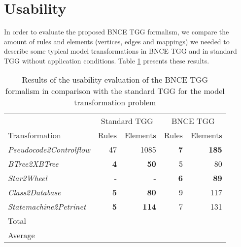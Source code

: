 
\section{Usability}
In order to evaluate the proposed BNCE TGG formalism, we compare the amount of rules and elements (vertices, edges and mappings) we needed to describe some typical model transformations in BNCE TGG and in standard TGG without application conditions. Table \ref{tab:formalism-eval} presents these results.


\begin{table}[h]
	\centering
	\begin{tabular}{l r r r r }
		\hline
						& \multicolumn{2}{c}{Standard TGG} & \multicolumn{2}{c}{BNCE TGG}\\
		Transformation 					& Rules & Elements 	& Rules & Elements\\
		\hline
		\emph{Pseudocode2Controlflow}	& 47			& 1085	& \textbf{7}	& \textbf{185} \\
		\emph{BTree2XBTree}				& \textbf{4}	& \textbf{50}	& 5		& 80 \\
		\emph{Star2Wheel}				& -				& -		& \textbf{6} 	& \textbf{89} \\
		\emph{Class2Database}			& \textbf{5}	& \textbf{80}	& 9 	& 117  \\
		\emph{Statemachine2Petrinet}	& \textbf{5}	& \textbf{114}	& 7		& 131 \\
		
		\hline
		Total					&  & 		&	& \\
		Average					&  & 		&	& \\
		\hline
	\end{tabular}
	\caption{Results of the usability evaluation of the BNCE TGG formalism in comparison with the standard TGG for the model transformation problem}
	\label{tab:formalism-eval}
\end{table}

